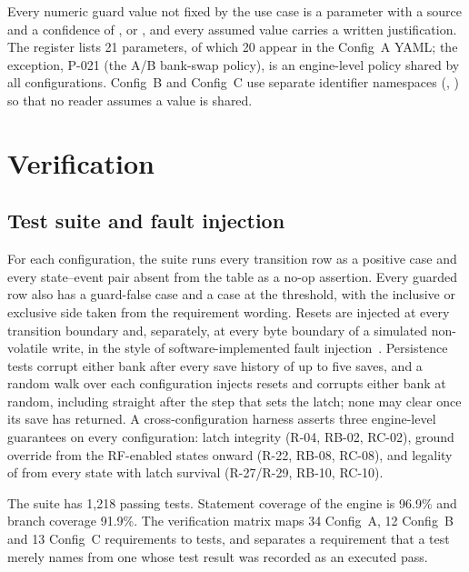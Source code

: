 \documentclass[preprint,12pt]{elsarticle}
\newcommand{\cfgA}{Config~A}
\newcommand{\cfgB}{Config~B}
\newcommand{\cfgC}{Config~C}
\newcommand{\TestCount}{1,218}
\begin{document}
Every numeric guard value not fixed by the use case is a parameter with a source and a confidence of ,  or , and every assumed value carries a written justification. The register lists 21  parameters, of which 20 appear in the \cfgA{} YAML; the exception, P-021 (the A/B bank-swap policy), is an engine-level policy shared by all configurations. \cfgB{} and \cfgC{} use separate identifier namespaces (, ) so that no reader assumes a value is shared.

\section{Verification}\label{sec:verification}

\subsection{Test suite and fault injection}

For each configuration, the suite runs every transition row as a positive case and every state--event pair absent from the table as a no-op assertion. Every guarded row also has a guard-false case and a case at the threshold, with the inclusive or exclusive side taken from the requirement wording. Resets are injected at every transition boundary and, separately, at every byte boundary of a simulated non-volatile write, in the style of software-implemented fault injection~\cite{Hsueh1997FaultInjection}. Persistence tests corrupt either bank after every save history of up to five saves, and a random walk over each configuration injects resets and corrupts either bank at random, including straight after the step that sets the latch; none may clear  once its save has returned. A cross-configuration harness asserts three engine-level guarantees on every configuration: latch integrity (R-04, RB-02, RC-02), ground override from the RF-enabled states onward (R-22, RB-08, RC-08), and legality of  from every state with latch survival (R-27/R-29, RB-10, RC-10).

The suite has \TestCount{} passing tests. Statement coverage of the engine is 96.9\% and branch coverage 91.9\%. The verification matrix maps 34 \cfgA{}, 12 \cfgB{} and 13 \cfgC{} requirements to tests, and separates a requirement that a test merely names from one whose test result was recorded as an executed pass.
\end{document}
